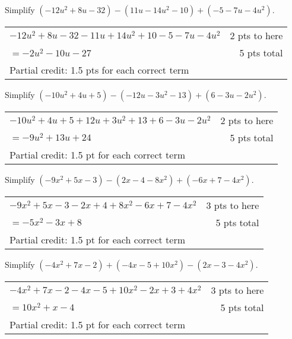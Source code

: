 {
	Simplify $(-12u^2+8u-32)-(11u-14u^2-10)+(-5-7u-4u^2)$.
}
{
	\begin{tabular}{l r}
	$-12u^2+8u-32-11u+14u^2+10 -5-7u-4u^2$  & 2 pts to here\\
	$=-2u^2-10u-27$ & 5 pts total\\
	Partial credit: 1.5 pts for each correct term
	\end{tabular}
}

{
	Simplify $(-10u^2+4u+5)-(-12u-3u^2-13)+(6-3u-2u^2)$.
}
{
	\begin{tabular}{l r}
	$-10u^2+4u+5+12u+3u^2+13+6-3u-2u^2$ & 2 pts to here\\
	$=-9u^2+13u+24$ &5 pts total\\
	Partial credit: 1.5 pt for each correct term
	\end{tabular}
}

{
	Simplify $(-9x^2+5x-3)-(2x-4-8x^2)+(-6x+7-4x^2)$.
}
{
	\begin{tabular}{l r}
	$-9x^2+5x-3-2x+4+8x^2-6x+7-4x^2$ & 3 pts to here\\
	$=-5x^2-3x+8$ & 5 pts total\\
	Partial credit: 1.5 pt for each correct term
	\end{tabular}
}

{
	Simplify $(-4x^2+7x-2)+(-4x-5+10x^2)-(2x-3-4x^2)$.
}
{
	\begin{tabular}{l r}
	$-4x^2+7x-2-4x-5+10x^2-2x+3+4x^2$ & 3 pts to here\\
	$=10x^2+x-4$ & 5 pts total\\
	Partial credit: 1.5 pt for each correct term
	\end{tabular}
}
